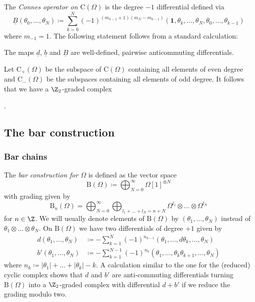 \documentclass[a4paper, english, 12pt, bibliography=totocnumbered,
index=totoc]{scrartcl}
\begin{document}
The \textit{Connes operator on $\mathrm{C}(\Omega)$} is the degree $-1$
differential defined via
\begin{equation*}
	\underline{B}(\theta_0, \ldots, \theta_N) \coloneqq \sum_{k=0}^N
	(-1)^{(m_{k-1} + 1)(m_N - m_{k-1})}(\mathbf{1}, \theta_{k},
	\ldots,
	\theta_{N}, \theta_0, \ldots, \theta_{k-1})
\end{equation*}
where $m_{-1} = 1$.
The following statement follows from a standard calculation:
\begin{lem}
	The maps $\underline{d}$, $\underline{b}$ and $\underline{B}$ are
	well-defined, pairwise anticommuting differentials.
\end{lem}
Let $\mathrm{C}_{+}(\Omega)$ be the subspace of $\mathrm{C}(\Omega)$ 
containing all elements of even 
degree and $\mathrm{C}_{-}(\Omega)$ be the subspaces containing all elements 
of odd degree.
It follows that we have a $\Z_2$-graded complex
\begin{center}
	.
\end{center}
\subsection{The bar construction}\label{Section: bar construction}
\subsubsection{Bar chains}
The \textit{bar construction for $\Omega$} is defined as the vector
space
\begin{equation}\label{Bar construction}
	\mathrm{B}(\Omega) \coloneqq \bigoplus_{N=0}^{\infty} \Omega[1]^{\otimes
		N}
\end{equation}
with grading given by
\begin{equation*}
	\mathrm{B}_n(\Omega) = \bigoplus_{N=0}^{\infty} \bigoplus_{l_1 + \ldots +
		l_N = n + N} \Omega^{l_1} \otimes \ldots \otimes \Omega^{l_N}
\end{equation*}
for $n \in \Z$.
We will usually denote elements of $\mathrm{B}(\Omega)$ by $(\theta_1,
\ldots, \theta_N)$ instead of $\theta_1 \otimes \ldots \otimes \theta_N$.
On $\mathrm{B}(\Omega)$ we have two differentials of degree $+1$ given by
\begin{align*}
	d(\theta_1, \ldots, \theta_N) & \coloneqq -\sum_{k=1}^N (-1)^{n_{k-1}}
	(\theta_1, \ldots, d \theta_k, \ldots, \theta_N) \\
	b'(\theta_1, \ldots, \theta_N) & \coloneqq - \sum_{k=1}^{N-1} (-1)^{n_{k}}
	(\theta_1, \ldots, \theta_k \theta_{k+1}, \ldots, \theta_N)
\end{align*}
where $n_k \coloneqq \lvert \theta_1 \rvert + \ldots + \lvert \theta_k \rvert
-k$.
A calculation similar to the one for the (reduced) cyclic complex shows that
$d$ and $b'$ are anti-commuting
differentials turning $\mathrm{B}(\Omega)$ into a $\Z_2$-graded complex with
differential $d + b'$ if we reduce the grading modulo two.
\end{document}

